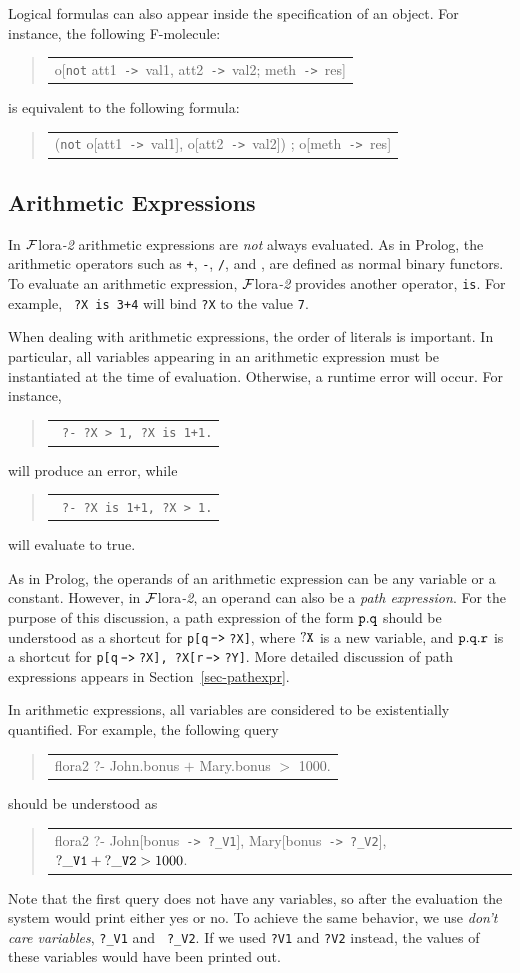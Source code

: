 \documentclass[11pt]{article}
\newenvironment{qrules}{\begin{quote}\tt\begin{tabular}[t]{l}}%
{\end{tabular}\end{quote}}
\newcommand{\mvd}{{\mbox{\tt \,->\,}}}  %
\newcommand{\FLORA}{{\mbox{\sc ${\cal F}${lora}\rm\emph{-2}}}\xspace}
\newcommand{\TNOT}{{{\tt not}}\xspace}
\begin{document}
%
Logical formulas can also appear inside the specification of an object. For
instance, the following F-molecule:
\begin{qrules}
o[\TNOT att1{\mvd}val1, att2{\mvd}val2; meth{\mvd}res]
\end{qrules}
is equivalent to the following formula:
\begin{qrules}
(\TNOT o[att1{\mvd}val1], o[att2{\mvd}val2]) ; o[meth{\mvd}res]
\end{qrules}


\subsection{Arithmetic Expressions}


In \FLORA arithmetic expressions are \emph{not} always evaluated. As in
Prolog, the arithmetic operators such as {\tt +}, {\tt -}, {\tt /}, and
{\tt *}, are defined as normal binary functors. To evaluate an arithmetic
expression, \FLORA provides another operator, {\tt is}.  For example, {\tt
  ?X is 3+4} will bind {\tt ?X} to the value {\tt 7}.

When dealing with arithmetic expressions, the order of literals is
important.  In particular, all variables appearing in an arithmetic
expression must be instantiated at the time of evaluation. Otherwise, a
runtime error will occur. For instance, 
\begin{qrules}
  \tt
?- ?X > 1, ?X is 1+1.
\end{qrules}
will produce an error, while
\begin{qrules}
  \tt
?- ?X is 1+1, ?X > 1.
\end{qrules}
will evaluate to true.

As in Prolog, the operands of an arithmetic expression can be any variable
or a constant. However, in \FLORA, an operand can also be a \emph{path
  expression}. For the purpose of this discussion, a path expression of the
form $\tt p.q$ should be understood as a shortcut for {\tt p[q$\mvd$?X]}, where
$\tt ?X$ is a new variable, and $\tt p.q.r$ is a shortcut for {\tt p[q$\mvd$?X],
  ?X[r$\mvd$?Y]}. More detailed discussion
of path expressions appears in Section~\ref{sec-pathexpr}.

In arithmetic expressions, all variables are considered to be
existentially quantified. For example, the following query
\begin{qrules}
flora2 ?- John.bonus $+$ Mary.bonus $>$ 1000.
\end{qrules}
should be understood as
\begin{qrules}
flora2 ?- John[bonus{\mvd}{\tt ?\_V1}], Mary[bonus{\mvd}{\tt ?\_V2}], ${\tt ?\_V1}+{\tt ?\_V2} > 1000$.
\end{qrules}
Note that the first query does not have any variables, so after the
evaluation the system would print either yes or no. To achieve the same
behavior, we use \emph{don't care variables}, {\tt ?\_V1} and {\tt
  ?\_V2}. If we used {\tt ?V1} and {\tt ?V2} instead, the values of these
variables would have been printed out.
\end{document}
